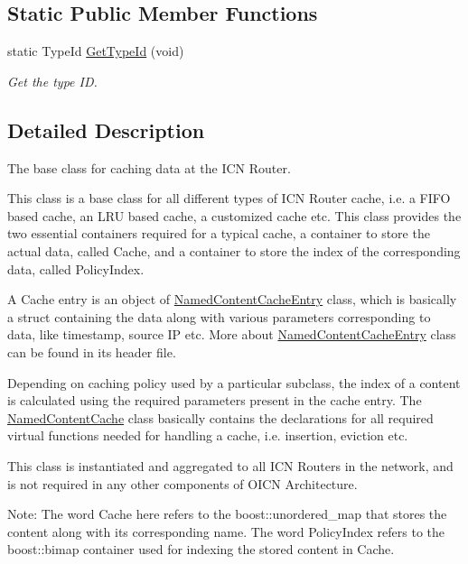 \subsection*{Static Public Member Functions}
\begin{DoxyCompactItemize}
\item 
static Type\-Id \hyperlink{classns3_1_1NamedContentCache_a6e1837a2d8896d7a53c7a8b1d3a472d3}{Get\-Type\-Id} (void)
\begin{DoxyCompactList}\small\item\em Get the type I\-D. \end{DoxyCompactList}\end{DoxyCompactItemize}


\subsection{Detailed Description}
The base class for caching data at the I\-C\-N Router. 

This class is a base class for all different types of I\-C\-N Router cache, i.\-e. a F\-I\-F\-O based cache, an L\-R\-U based cache, a customized cache etc. This class provides the two essential containers required for a typical cache, a container to store the actual data, called Cache, and a container to store the index of the corresponding data, called Policy\-Index.

A Cache entry is an object of \hyperlink{classns3_1_1NamedContentCacheEntry}{Named\-Content\-Cache\-Entry} class, which is basically a struct containing the data along with various parameters corresponding to data, like timestamp, source I\-P etc. More about \hyperlink{classns3_1_1NamedContentCacheEntry}{Named\-Content\-Cache\-Entry} class can be found in its header file.

Depending on caching policy used by a particular subclass, the index of a content is calculated using the required parameters present in the cache entry. The \hyperlink{classns3_1_1NamedContentCache}{Named\-Content\-Cache} class basically contains the declarations for all required virtual functions needed for handling a cache, i.\-e. insertion, eviction etc.

This class is instantiated and aggregated to all I\-C\-N Routers in the network, and is not required in any other components of O\-I\-C\-N Architecture.

Note\-: The word Cache here refers to the boost\-::unordered\-\_\-map that stores the content along with its corresponding name. The word Policy\-Index refers to the boost\-::bimap container used for indexing the stored content in Cache. 

